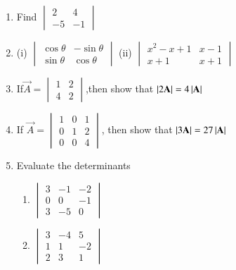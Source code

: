 \renewcommand{\theequation}{\theenumi}
\begin{enumerate}[label=\arabic*.,ref=\thesubsection.\theenumi]

\item Find 
$\begin{vmatrix}
2&4\\-5&-1
\end{vmatrix}$
\\
\solution 


\item (i) $\begin{vmatrix}\cos\theta& -\sin\theta\\ \sin\theta& \cos\theta \end{vmatrix}$ 
(ii) $\begin{vmatrix}
x^2-x+1& x-1\\ x+1&  x+1
\end{vmatrix}$
\\
\solution 

\item If$ \vec{A} = \begin{vmatrix}1&2\\4&2\end{vmatrix}$,then show that  
$\left\vert2\mathbf{A}\right\vert=4\left\vert\mathbf{A}\right\vert$
\\
\solution 

\item If $\vec{A}=\begin{vmatrix}1&0&1\\0&1&2\\0&0&4\end{vmatrix}$, then show that $\left\vert3\mathbf{A}\right\vert=27\left\vert\mathbf{A}\right\vert$
\\
\solution 

\item Evaluate the determinants
\begin{enumerate}
\item $\begin{vmatrix}
3&-1&-2\\0&0&-1\\3&-5&0
\end{vmatrix}$
\item $\begin{vmatrix}
3&-4&5\\1&1&-2\\2&3&1
\end{vmatrix}$
\\

\end{enumerate}
\end{enumerate}
